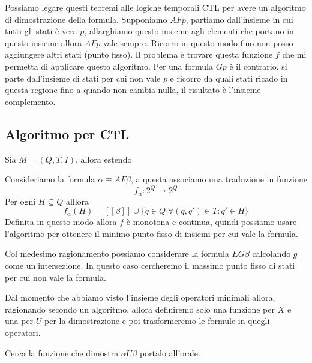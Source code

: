 Possiamo legare questi teoremi alle logiche temporali CTL per avere un algoritmo
di dimostrazione della formula. Supponiamo $AFp$, partiamo dall'insieme in cui
tutti gli stati è vera $p$, allarghiamo questo insieme agli elementi che portano in
questo insieme allora $AFp$ vale sempre. Ricorro in questo modo fino non posso
aggiungere altri stati (punto fisso). Il problema è trovare questa funzione $f$
che mi permetta di applicare questo algoritmo. 
Per una formula $Gp$ è il contrario, si parte dall'insieme di stati per cui non
vale $p$ e ricorro da quali stati ricado in questa regione fino a quando non cambia
nulla, il risultato è l'insieme complemento.

\subsection{Algoritmo per CTL}
Sia $M=(Q,T,I)$, allora estendo 

Consideriamo la formula $\alpha\equiv AF\beta$, a questa associamo una traduzione
in funzione
\begin{equation}
    f_\alpha:2^Q\to 2^Q
\end{equation}
Per ogni $H\subseteq Q$ alllora
\begin{equation}
    f_\alpha(H) = [[\beta]]\cup \{q\in Q|\forall (q,q')\in T:q'\in H\}
\end{equation}
Definita in questo modo allora $f$ è monotona e continua, quindi possiamo usare
l'algoritmo per ottenere il minimo punto fisso di insiemi per cui vale la formula.


Col medesimo ragionamento possiamo considerare la formula $EG\beta$ 
calcolando $g$ come un'intersezione. In questo caso cercheremo il massimo punto
fisso di stati per cui non vale la formula.

Dal momento che abbiamo visto l'insieme degli operatori minimali allora, ragionando
secondo un algoritmo, allora definiremo solo una funzione per $X$ e una per $U$
per la dimostrazione e poi trasformeremo le formule in quegli operatori.

Cerca la funzione che dimostra $\alpha U \beta$ portalo all'orale.